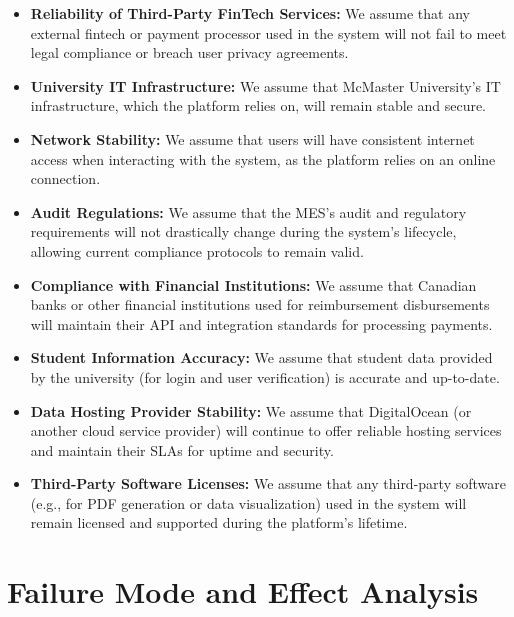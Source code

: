 \documentclass{article}
\begin{document}
\begin{itemize}
    \item \textbf{Reliability of Third-Party FinTech Services:} We assume that any external fintech or payment processor used in the system will not fail to meet legal compliance or breach user privacy agreements.
    
    \item \textbf{University IT Infrastructure:} We assume that McMaster University’s IT infrastructure, which the platform relies on, will remain stable and secure.
    
    \item \textbf{Network Stability:} We assume that users will have consistent internet access when interacting with the system, as the platform relies on an online connection.
    
    \item \textbf{Audit Regulations:} We assume that the MES's audit and regulatory requirements will not drastically change during the system's lifecycle, allowing current compliance protocols to remain valid.
    
    \item \textbf{Compliance with Financial Institutions:} We assume that Canadian banks or other financial institutions used for reimbursement disbursements will maintain their API and integration standards for processing payments.
    
    \item \textbf{Student Information Accuracy:} We assume that student data provided by the university (for login and user verification) is accurate and up-to-date.
    
    \item \textbf{Data Hosting Provider Stability:} We assume that DigitalOcean (or another cloud service provider) will continue to offer reliable hosting services and maintain their SLAs for uptime and security.
    
    \item \textbf{Third-Party Software Licenses:} We assume that any third-party software (e.g., for PDF generation or data visualization) used in the system will remain licensed and supported during the platform's lifetime.
\end{itemize}

\section{Failure Mode and Effect Analysis}
\end{document}
